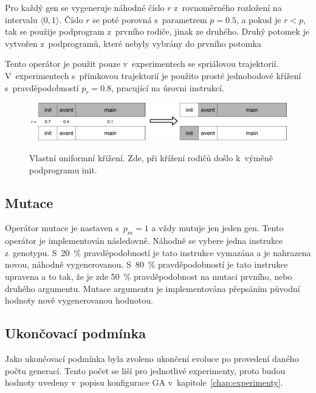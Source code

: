 Pro každý gen se vygeneruje náhodné číslo $r$ z~rovnoměrného rozložení na intervalu $\langle 0, 1\rangle$.
Číslo $r$ se poté porovná s~parametrem $p = 0.5$, a pokud je $r < p$, tak se použije podprogram z~prvního rodiče, jinak ze druhého.
Druhý potomek je vytvořen z~podprogramů, které nebyly vybrány do prvního potomka

Tento operátor je použit pouze v~experimentech se spriálovou trajektorií.
V~experimentech s~přímkovou trajektorií je použito prosté jednobodové křížení s~pravděpodobností $p_r = 0.8$, pracující na úrovni instrukcí.

\begin{figure}[h]
    \centering
    {\includegraphics[width=35em]{obrazky/krizeni_podprogramu.pdf}}
    \caption[Vlastní uniformní křížení]{
    Vlastní uniformní křížení.
    Zde, při křížení rodičů došlo k~výměně podprogramu init.
    }
    \label{fig:krizeni_podprogramu}
\end{figure}

\subsection{Mutace}
Operátor mutace je nastaven s~$p_m = 1$ a vždy mutuje jen jeden gen.
Tento operátor je implementován následovně.
Náhodně se vybere jedna instrukce z~genotypu.
S~20~\% pravděpodobností je tato instrukce vymazána a je nahrazena novou, náhodně vygenerovanou.
S~80~\% pravděpodobností je tato instrukce upravena a to tak, že je zde 50~\% pravděpodobnost na mutaci prvního, nebo druhého argumentu.
Mutace argumentu je implementována přepsáním původní hodnoty nově vygenerovanou hodnotou.


\subsection{Ukončovací podmínka}
Jako ukončovací podmínka byla zvoleno ukončení evoluce po provedení daného počtu generací.
Tento počet se liší pro jednotlivé experimenty, proto budou hodnoty uvedeny v~popisu konfigurace GA v~kapitole~\ref{chap:experimenty}.



